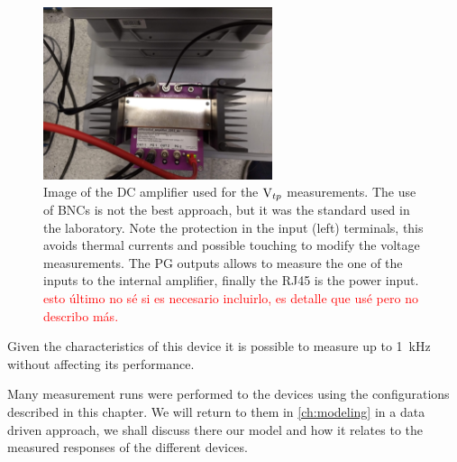 \begin{figure}
    \centering
    \includegraphics[width=0.6\textwidth]{figures/experimental/DCamp2.jpg}
    \caption{Image of the DC amplifier used for the  \( \text{V}_{tp} \) measurements. The use of BNCs is not the best approach, but it was the standard used in the laboratory. Note the protection in the input (left) terminals, this avoids thermal currents and possible touching to modify the voltage measurements. 
    The PG outputs allows to measure the one of the inputs to the internal amplifier, finally the RJ45 is the power input.  \textcolor{red}{esto último no sé si es necesario incluirlo, es detalle que usé pero no describo más.}}
    \label{fig:DCamp}
\end{figure}

Given the characteristics of this device it is possible to measure up to \SI{1}{\kilo\hertz} without affecting its performance. 

Many measurement runs were performed to the devices using the configurations described in this chapter. We will return to them in \ref{ch:modeling} in a data driven approach, we shall discuss there our model and how it relates to the measured responses of the different devices. 
